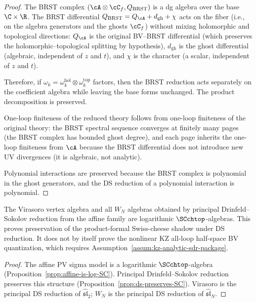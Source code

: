 \begin{proof}
The BRST complex $(\cA \otimes \cC_f, Q_{\mathrm{BRST}})$ is a dg
algebra over the base $\C \times \R$. The BRST differential
$Q_{\mathrm{BRST}} = Q_\cA + d_{\mathrm{gh}} + \chi$ acts on
the fiber (i.e., on the algebra generators and the ghosts $\cC_f$)
without mixing holomorphic and topological directions: $Q_\cA$ is the
original BV--BRST differential (which preserves the
holomorphic--topological splitting by hypothesis), $d_{\mathrm{gh}}$
is the ghost differential (algebraic, independent of $z$ and $t$),
and $\chi$ is the character (a scalar, independent of $z$ and $t$).

Therefore, if $\omega_k = \omega_k^{\mathrm{hol}} \otimes
\omega_k^{\mathrm{top}}$ factors, then the BRST reduction acts
separately on the coefficient algebra while leaving the base
forms unchanged. The product decomposition is preserved.

One-loop finiteness of the reduced theory follows from
one-loop finiteness of the original theory: the BRST spectral
sequence converges at finitely many pages (the BRST complex has
bounded ghost degree), and each page inherits the one-loop
finiteness from $\cA$ because the BRST differential does not
introduce new UV divergences (it is algebraic, not analytic).

Polynomial interactions are preserved because the BRST complex
is polynomial in the ghost generators, and the DS reduction of a
polynomial interaction is polynomial.
\end{proof}

\begin{corollary}%
\label{cor:virasoro-wn-are-SC}
The Virasoro vertex algebra and all $W_N$ algebras obtained by
principal Drinfeld--Sokolov reduction from the affine family are
logarithmic $\SCchtop$-algebras. This proves preservation of the
product-formal Swiss-cheese shadow under DS reduction. It does not by
itself prove the nonlinear KZ all-loop half-space BV quantization,
which requires Assumption~\ref{assum:kz-analytic-sdr-package}.
\end{corollary}

\begin{proof}
The affine PV sigma model is a logarithmic $\SCchtop$-algebra
(Proposition~\ref{prop:affine-is-log-SC}). Principal
Drinfeld--Sokolov reduction preserves this structure
(Proposition~\ref{prop:ds-preserves-SC}). Virasoro is the principal
DS reduction of $\widehat{\mathfrak{sl}}_2$; $W_N$ is the principal DS
reduction of $\widehat{\mathfrak{sl}}_N$.
\end{proof}

